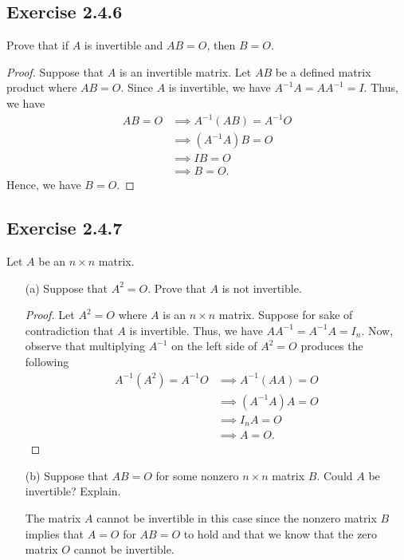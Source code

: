 \subsection*{Exercise 2.4.6} Prove that if \( A  \) is invertible and \( AB = O  \), then \( B = O  \).
\begin{proof}
Suppose that \( A  \) is an invertible matrix. Let \( AB  \) be a defined matrix product where \( AB = O  \). Since \( A  \) is invertible, we have \( A^{-1}A = A A^{-1} = I \). Thus, we have
\begin{align*}
    AB = O &\implies A^{-1}(AB) = A^{-1}O   \\
           &\implies (A^{-1}A)B = O \\
           &\implies IB = O \\
           &\implies B = O. 
\end{align*}
Hence, we have \( B = O  \).
\end{proof}

\subsection*{Exercise 2.4.7} Let \( A  \) be an \( n \times n  \) matrix.
\begin{enumerate}
    \item[(a)] Suppose that \( A^{2} = O  \). Prove that \( A  \) is not invertible.
        \begin{proof}
        Let \( A^{2} = O  \) where \( A  \) is an \( n \times n  \) matrix. Suppose for sake of contradiction that \( A  \) is invertible. Thus, we have \( A A^{-1} = A^{-1} A = {I}_{n}  \). Now, observe that multiplying \( A^{-1}  \) on the left side of \( A^{2} = O  \) produces the following  
        \begin{align*}
            A^{-1} (A^{2}) = A^{-1}O &\implies A^{-1}(AA ) = O       \\
                                     &\implies (A^{-1}A)A = O  \\ 
                                     &\implies {I}_{n}A = O \\ 
                                     &\implies A = O.
        \end{align*}
        \end{proof}
    \item[(b)] Suppose that \( AB = O  \) for some nonzero \( n \times n  \) matrix \( B  \). Could \( A  \) be invertible? Explain.
        \begin{solution}
        The matrix \( A  \) cannot be invertible in this case since the nonzero matrix \( B   \) implies that \( A = O   \) for \( AB = O  \) to hold and that we know that the zero matrix \( O  \) cannot be invertible.
        \end{solution}
\end{enumerate}

